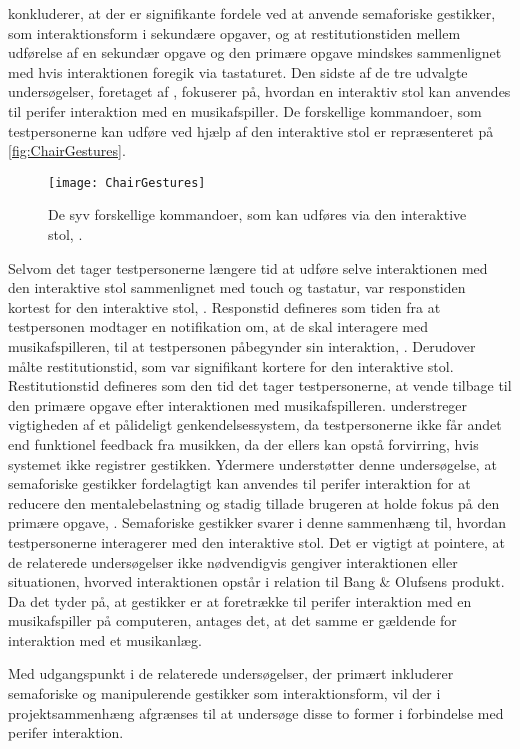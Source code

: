 \textcite[s. 1964]{PDF:AStudyOnTheUseOfSemaphoricGestures} konkluderer, at der er signifikante fordele ved at anvende semaforiske gestikker, som interaktionsform i sekundære opgaver, og at restitutionstiden mellem udførelse af en sekundær opgave og den primære opgave mindskes sammenlignet med hvis interaktionen foregik via tastaturet.\blankline
%
Den sidste af de tre udvalgte undersøgelser, foretaget af \textcite[ss. 6-9]{PDF:AChairAsUbiquitousInputDevice}, fokuserer på, hvordan en interaktiv stol kan anvendes til perifer interaktion med en musikafspiller. De forskellige kommandoer, som testpersonerne kan udføre ved hjælp af den interaktive stol er repræsenteret på \autoref{fig:ChairGestures}. 
%
\begin{figure}[H]
	\centering
	\texttt{[image: ChairGestures]}
	\caption{De syv forskellige kommandoer, som kan udføres via den interaktive stol, \parencite[s. 3]{PDF:AChairAsUbiquitousInputDevice}.}
	\label{fig:ChairGestures}
\end{figure}
\noindent
%
Selvom det tager testpersonerne længere tid at udføre selve interaktionen med den interaktive stol sammenlignet med touch og tastatur, var responstiden kortest for den interaktive stol, \textcite[s. 7]{PDF:AChairAsUbiquitousInputDevice}. Responstid defineres som tiden fra at testpersonen modtager en notifikation om, at de skal interagere med musikafspilleren, til at testpersonen påbegynder sin interaktion, \parencite[s. 6]{PDF:AChairAsUbiquitousInputDevice}. Derudover målte \textcite[s. 7]{PDF:AChairAsUbiquitousInputDevice} restitutionstid, som var signifikant kortere for den interaktive stol. Restitutionstid defineres som den tid det tager testpersonerne, at vende tilbage til den primære opgave efter interaktionen med musikafspilleren. \textcite[s. 8]{PDF:AChairAsUbiquitousInputDevice} understreger vigtigheden af et pålideligt genkendelsessystem, da testpersonerne ikke får andet end funktionel feedback fra musikken, da der ellers kan opstå forvirring, hvis systemet ikke registrer gestikken. Ydermere understøtter denne undersøgelse, at semaforiske gestikker fordelagtigt kan anvendes til perifer interaktion for at reducere den mentalebelastning og stadig tillade brugeren at holde fokus på den primære opgave, \parencite[s. 8]{PDF:AChairAsUbiquitousInputDevice}. Semaforiske gestikker svarer i denne sammenhæng til, hvordan testpersonerne interagerer med den interaktive stol. \blankline
%
Det er vigtigt at pointere, at de relaterede undersøgelser ikke nødvendigvis gengiver interaktionen eller situationen, hvorved interaktionen opstår i relation til Bang $\&$ Olufsens produkt. Da det tyder på, at gestikker er at foretrække til perifer interaktion med en musikafspiller på computeren, antages det, at det samme er gældende for interaktion med et musikanlæg. 

Med udgangspunkt i de relaterede undersøgelser, der primært inkluderer semaforiske og manipulerende gestikker som interaktionsform, vil der i projektsammenhæng afgrænses til at undersøge disse to former i forbindelse med perifer interaktion.   
